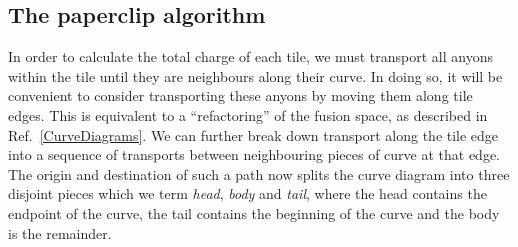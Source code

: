 \documentclass[aps, letterpaper, onecolumn, superscriptaddress, notitlepage, 10pt]{revtex4-1}
\begin{document}
%



%
%

\subsection{The paperclip algorithm}

In order to calculate the total charge of each tile, we must transport all anyons within the tile until they are neighbours along their curve. In doing so, it will be convenient to consider transporting these anyons by moving them along tile edges. This is equivalent to a ``refactoring'' of the fusion space, as described in Ref.~\ref{CurveDiagrams}. We can further break down transport along the tile edge into a sequence of transports between neighbouring pieces of curve at that edge.
The origin and destination of such a path
now splits the curve diagram
into three disjoint pieces which we term
\emph{head}, \emph{body} and \emph{tail}, where
the head contains the endpoint of the curve, the tail
contains the beginning of the curve and the body is the remainder.
\end{document}
